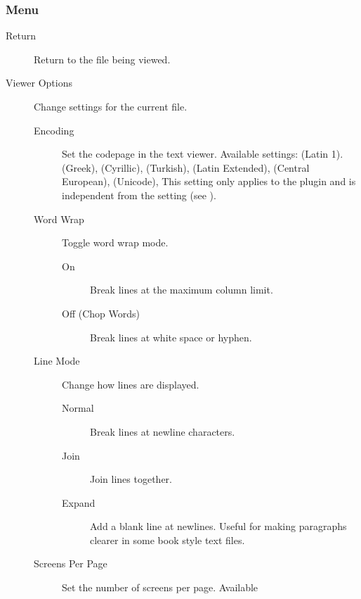 \subsubsection{Menu}

\begin{description}
\item[Return] Return to the file being viewed.
\item[Viewer Options] Change settings for the current file.
    \begin{description}
    \item[Encoding] Set the codepage in the text viewer.
    Available settings:
     (Latin 1).
     (Greek),
     (Cyrillic),
     (Turkish),
     (Latin Extended),
     (Central European),
     (Unicode),
    This setting only applies to the plugin and is independent from the
     setting (see ).
    \item[Word Wrap] Toggle word wrap mode.
        \begin{description}
            \item[On] Break lines at the maximum column limit.
            \item[Off (Chop Words)] Break lines at white space or hyphen.
        \end{description}
    \item[Line Mode] Change how lines are displayed.
        \begin{description}
            \item[Normal] Break lines at newline characters.
            \item[Join] Join lines together.
            \item[Expand] Add a blank line at newlines. Useful for making paragraphs
            clearer in some book style text files.
        \end{description}
    \item[Screens Per Page] Set the number of screens per page. Available

\end{description}
\end{description}
